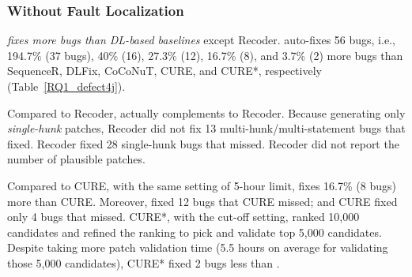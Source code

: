 \subsubsection{{\bf Without Fault Localization}}

{\em {\tool} fixes more bugs than DL-based baselines} except
Recoder. {\tool} auto-fixes 56 bugs, i.e., 194.7\% (37 bugs), 40\%
(16), 27.3\% (12), 16.7\% (8), and 3.7\% (2) more bugs than
Sequen\-ceR, DLFix, CoCoNuT, CURE, and CURE*, respectively
(Table~\ref{RQ1_defect4j}).

Compared to Recoder, {\tool} actually complements to Recoder.  Because
generating only {\em single-hunk} patches, Recoder did not fix 13
multi-hunk/multi-statement bugs that {\tool} fixed. Recoder fixed 28
single-hunk bugs that {\tool} missed. Recoder did not report the
number of plausible patches.


Compared to CURE, with the same setting of 5-hour limit, {\tool} fixes
16.7\% (8 bugs) more than CURE. Moreover, {\tool} fixed 12 bugs that
CURE missed; and CURE fixed only 4 bugs that {\tool} missed.
%
CURE*, with the cut-off setting, ranked 10,000 candidates and refined
the ranking to pick and validate top 5,000 candidates. Despite taking
more patch validation time (5.5 hours on average for
validating those 5,000 candidates), CURE* fixed 2 bugs less than
{\tool}.



